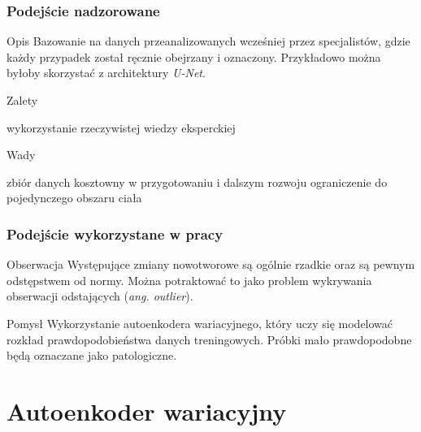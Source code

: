 \documentclass[polish, 13pt]{beamer}
\begin{document}
\begin{frame}
 \frametitle{Podejście nadzorowane}
 \begin{block}{Opis}
 Bazowanie na danych przeanalizowanych wcześniej przez specjalistów, gdzie każdy przypadek został ręcznie obejrzany i oznaczony. Przykładowo można byłoby skorzystać z architektury \textit{U-Net}.
 \end{block}
 \pause
 \begin{exampleblock}{Zalety}
 \begin{itemize}
    \pro wykorzystanie rzeczywistej wiedzy eksperckiej
 \end{itemize}
 \end{exampleblock}
 \pause
 \begin{alertblock}{Wady}
 \begin{itemize}
    \con zbiór danych kosztowny w przygotowaniu i dalszym rozwoju
    \con ograniczenie do pojedynczego obszaru ciała
 \end{itemize}
 \end{alertblock}
\end{frame}

\begin{frame}
 \frametitle{Podejście wykorzystane w pracy}
 
 \begin{block}{Obserwacja}
  Występujące zmiany nowotworowe są ogólnie rzadkie oraz są pewnym odstępstwem od normy. Można potraktować to jako problem wykrywania obserwacji odstających (\textit{ang. outlier}).
 \end{block}
 \pause
 \begin{block}{Pomysł}
  Wykorzystanie autoenkodera wariacyjnego, który uczy się modelować rozkład prawdopodobieństwa danych treningowych. Próbki mało prawdopodobne będą oznaczane jako patologiczne. 
 \end{block}
 
\end{frame}


\section{Autoenkoder wariacyjny}
\end{document}
